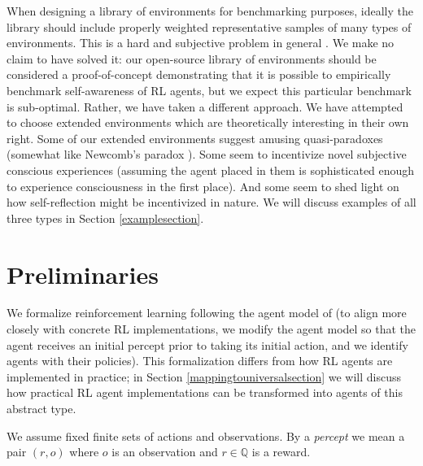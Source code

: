 \documentclass{article}
\begin{document}
When designing a library of environments for benchmarking purposes, ideally the
library should include properly weighted representative samples of many types of
environments. This is a hard and subjective problem in general
\cite{leike2015bad}. We make no claim to have solved
it: our open-source library of environments should be considered a proof-of-concept
demonstrating that it is possible to empirically benchmark self-awareness of RL
agents, but we expect this particular benchmark is sub-optimal.
Rather, we have taken a different approach.
We have attempted to choose extended environments which are theoretically
interesting in their own right. Some of our extended environments
suggest amusing quasi-paradoxes (somewhat like Newcomb's paradox
\cite{nozick1969newcomb}). Some seem to incentivize novel subjective conscious
experiences (assuming the agent placed in them is sophisticated enough to experience
consciousness in the first place). And some seem to shed light on how self-reflection
might be incentivized in nature. We will discuss examples of all three types in
Section \ref{examplesection}.

\section{Preliminaries}

We formalize reinforcement learning following
the agent model of \cite{hutter2004universal}
(to align more closely with concrete RL implementations, we modify
the agent model so that the agent receives an initial percept prior
to taking its initial action, and we identify agents with their policies).
This formalization differs from how RL agents are
implemented in practice; in Section \ref{mappingtouniversalsection}
we will discuss how practical RL agent implementations can be
transformed into agents of this abstract type.

We assume fixed finite sets of actions and observations. By a \emph{percept}
we mean a pair $(r,o)$ where $o$ is an observation and $r\in\mathbb Q$
is a reward.
\end{document}
